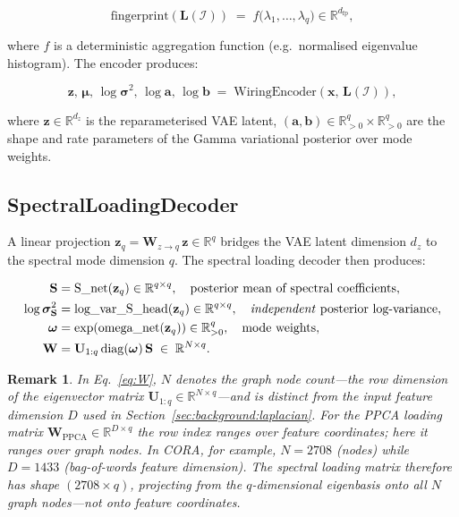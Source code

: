 \documentclass[11pt,a4paper]{article}
\newtheorem{remark}{Remark}
\newcommand{\Lmat}{\mathbf{L}}
\newcommand{\Umat}{\mathbf{U}}
\newcommand{\Smat}{\mathbf{S}}
\newcommand{\Wmat}{\mathbf{W}}
\newcommand{\R}{\mathbb{R}}
\begin{document}
\begin{equation}
  \text{fingerprint}(\Lmat(\mathcal{I})) \;=\; f\bigl(\lambda_1,\ldots,\lambda_q\bigr)
  \in \R^{d_{\text{fp}}},
  \label{eq:fingerprint}
\end{equation}

where $f$ is a deterministic aggregation function (e.g.\ normalised eigenvalue
histogram).  The encoder produces:

\begin{equation}
  \mathbf{z},\,\boldsymbol{\mu},\,\log\boldsymbol{\sigma}^2,\,
  \log\mathbf{a},\,\log\mathbf{b}
  \;=\; \text{WiringEncoder}(\mathbf{x},\,\Lmat(\mathcal{I})),
  \label{eq:encoder}
\end{equation}

where $\mathbf{z}\in\R^{d_z}$ is the reparameterised VAE latent,
$(\mathbf{a},\mathbf{b})\in\R^q_{>0}\times\R^q_{>0}$ are the shape and rate
parameters of the Gamma variational posterior over mode weights.

\subsection{SpectralLoadingDecoder}
\label{sec:architecture:decoder}

A linear projection $\mathbf{z}_q = \mathbf{W}_{z\to q}\,\mathbf{z} \in\R^q$ bridges
the VAE latent dimension $d_z$ to the spectral mode dimension $q$.
The spectral loading decoder then produces:

\begin{align}
  \Smat &= \text{S\_net}(\mathbf{z}_q) \in \R^{q\times q},\quad
  \text{posterior mean of spectral coefficients},
  \label{eq:S} \\
  \log\boldsymbol{\sigma}^2_{\Smat} &= \text{log\_var\_S\_head}(\mathbf{z}_q)
  \in \R^{q\times q},\quad
  \text{\emph{independent} posterior log-variance},
  \label{eq:logvarS} \\
  \boldsymbol{\omega} &= \exp(\text{omega\_net}(\mathbf{z}_q)) \in \R^q_{>0},\quad
  \text{mode weights},
  \label{eq:omega} \\
  \Wmat &= \Umat_{1:q}\,\mathrm{diag}(\boldsymbol{\omega})\,\Smat
  \;\in\; \R^{N\times q}.
  \label{eq:W}
\end{align}

\begin{remark}\label{rem:N-vs-D}
In Eq.~\eqref{eq:W}, $N$ denotes the \emph{graph node count}---the row
dimension of the eigenvector matrix $\Umat_{1:q}\in\R^{N\times q}$---and
is \emph{distinct} from the input feature dimension $D$ used in
Section~\ref{sec:background:laplacian}.  For the PPCA loading matrix
$\Wmat_{\text{PPCA}}\in\R^{D\times q}$ the row index ranges over feature
coordinates; here it ranges over graph nodes.
In CORA, for example, $N=2708$ (nodes) while $D=1433$ (bag-of-words
feature dimension).  The spectral loading matrix therefore has shape
$(2708\times q)$, projecting from the $q$-dimensional eigenbasis onto
all $N$ graph nodes---not onto feature coordinates.
\end{remark}
\end{document}
